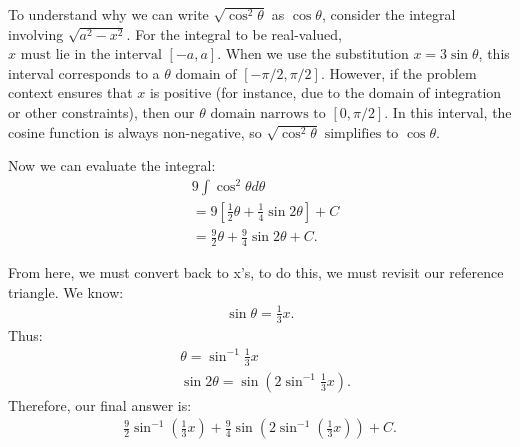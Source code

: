 \documentclass{report}
\begin{document}
    \bigbreak \noindent 
   To understand why we can write $ \sqrt{\cos^2{\theta}}$  as  $\cos{\theta}$, consider the integral involving $\sqrt{a^2 - x^2}$. For the integral to be real-valued, $x \text{ must lie in the interval } [-a, a]$. When we use the substitution $x = 3\sin{\theta}$,  this interval corresponds to a $ \theta \text{ domain of } [-\pi/2, \pi/2]$. However, if the problem context ensures that  $x$ is positive (for instance, due to the domain of integration or other constraints), then our  $\theta \text{ domain narrows to } [0, \pi/2]$. In this interval, the cosine function is always non-negative, so $ \sqrt{\cos^2{\theta}} \text{ simplifies to } \cos{\theta}$.

   \pagebreak \bigbreak \noindent 
   Now we can evaluate the integral:
   \begin{align*}
       &9\int \cos^{2}{\theta }d\theta  \\
       &=9 \left[\frac{1}{2}\theta +\frac{1}{4}\sin{2\theta }\right] + C \\
       &=\frac{9}{2}\theta +\frac{9}{4}\sin{2\theta } + C
   .\end{align*}
   \bigbreak \noindent 
   \begin{minipage}[]{0.47\textwidth}
       From here, we must convert back to x's, to do this, we must revisit our reference triangle. We know:
       \begin{align*}
           \sin{\theta } = \frac{1}{3}x
       .\end{align*}
       \bigbreak \noindent 
       Thus:
       \begin{align*}
           &\theta  = \sin^{-1}{\frac{1}{3}x} \\
           &\sin{2\theta } = \sin{\left(2\sin^{-1}{\frac{1}{3}x}\right)}
       .\end{align*}
       \bigbreak \noindent 
       Therefore, our final answer is:
       \begin{align*}
           \frac{9}{2}\sin^{-1}{\left(\frac{1}{3}x\right)}+\frac{9}{4}\sin{\left(2\sin^{-1}{\left(\frac{1}{3}x\right)}\right)} + C
       .\end{align*}
   \end{minipage}
   \hspace{.5in}
   \begin{minipage}[]{0.47\textwidth}
   \end{minipage}
\end{document}
